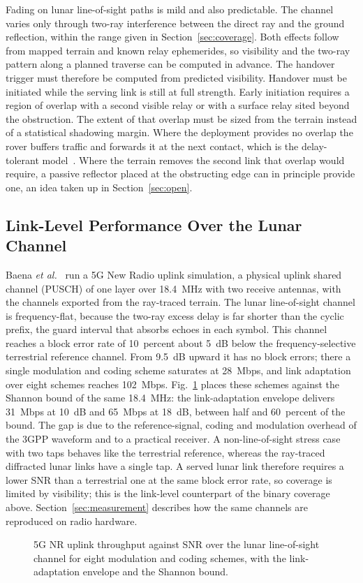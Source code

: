 \documentclass{IEEEoj}
\begin{document}
Fading on lunar line-of-sight paths is mild and also predictable. The channel varies only through two-ray interference between the direct ray and the ground reflection, within the range given in Section~\ref{sec:coverage}. Both effects follow from mapped terrain and known relay ephemerides, so visibility and the two-ray pattern along a planned traverse can be computed in advance. The handover trigger must therefore be computed from predicted visibility. Handover must be initiated while the serving link is still at full strength. Early initiation requires a region of overlap with a second visible relay or with a surface relay sited beyond the obstruction. The extent of that overlap must be sized from the terrain instead of a statistical shadowing margin. Where the deployment provides no overlap the rover buffers traffic and forwards it at the next contact, which is the delay-tolerant model~\cite{rfc9171,rfc4838}. Where the terrain removes the second link that overlap would require, a passive reflector placed at the obstructing edge can in principle provide one, an idea taken up in Section~\ref{sec:open}.




\subsection{Link-Level Performance Over the Lunar Channel}
\label{sec:linklevel}
Baena \emph{et al.}~\cite{baena2027surface} run a 5G New Radio uplink simulation, a physical uplink shared channel (PUSCH) of one layer over \SI{18.4}{MHz} with two receive antennas, with the channels exported from the ray-traced terrain. The lunar line-of-sight channel is frequency-flat, because the two-ray excess delay is far shorter than the cyclic prefix, the guard interval that absorbs echoes in each symbol. This channel reaches a block error rate of 10~percent about \SI{5}{dB} below the frequency-selective terrestrial reference channel. From \SI{9.5}{dB} upward it has no block errors; there a single modulation and coding scheme saturates at \SI{28}{Mbps}, and link adaptation over eight schemes reaches \SI{102}{Mbps}. Fig.~\ref{fig:bler} places these schemes against the Shannon bound of the same \SI{18.4}{MHz}: the link-adaptation envelope delivers \SI{31}{Mbps} at \SI{10}{dB} and \SI{65}{Mbps} at \SI{18}{dB}, between half and 60~percent of the bound. The gap is due to the reference-signal, coding and modulation overhead of the 3GPP waveform and to a practical receiver. A non-line-of-sight stress case with two taps behaves like the terrestrial reference, whereas the ray-traced diffracted lunar links have a single tap. A served lunar link therefore requires a lower SNR than a terrestrial one at the same block error rate, so coverage is limited by visibility; this is the link-level counterpart of the binary coverage above. Section~\ref{sec:measurement} describes how the same channels are reproduced on radio hardware.
\begin{figure}[!t]
\centering

\caption{5G NR uplink throughput against SNR over the lunar line-of-sight channel for eight modulation and coding schemes, with the link-adaptation envelope and the Shannon bound.}
\label{fig:bler}
\end{figure}
\end{document}
